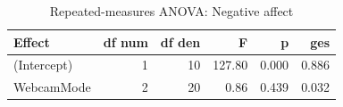 \begin{table}[!h]
\centering
\caption{\label{tab:tab:anova_na}Repeated-measures ANOVA: Negative affect}
\centering
\begin{tabular}[t]{lrrrrr}
\toprule
Effect & df num & df den & F & p & ges\\
\midrule
(Intercept) & 1 & 10 & 127.80 & 0.000 & 0.886\\
WebcamMode & 2 & 20 & 0.86 & 0.439 & 0.032\\
\bottomrule
\end{tabular}
\end{table}
